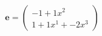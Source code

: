 \documentclass[preview]{standalone}
\begin{document}
\begin{align*}
\mathbf{e} = \begin{pmatrix}-1 + 1x^{2} \\ 1 + 1x^{1} + -2x^{3}\end{pmatrix}
\end{align*}
\end{document}
